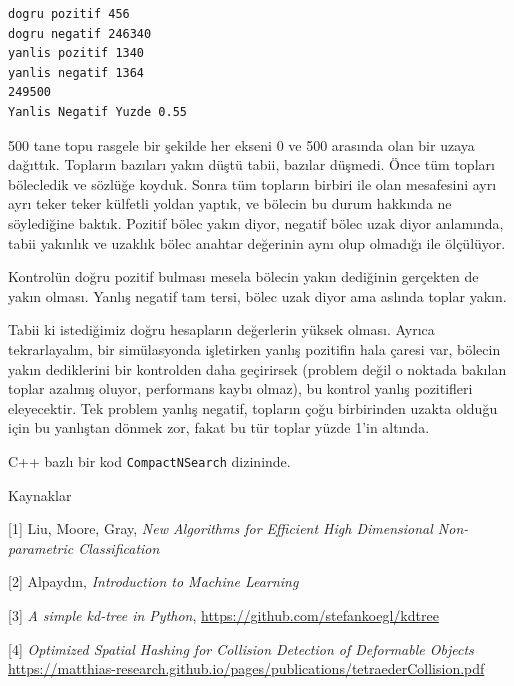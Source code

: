 \documentclass[12pt,fleqn]{article}\usepackage{../../common}
\begin{document}
\begin{verbatim}
dogru pozitif 456
dogru negatif 246340
yanlis pozitif 1340
yanlis negatif 1364
249500
Yanlis Negatif Yuzde 0.55
\end{verbatim}

500 tane topu rasgele bir şekilde her ekseni 0 ve 500 arasında olan bir uzaya
dağıttık. Topların bazıları yakın düştü tabii, bazılar düşmedi. Önce tüm topları
bölecledik ve sözlüğe koyduk. Sonra tüm topların birbiri ile olan mesafesini
ayrı ayrı teker teker külfetli yoldan yaptık, ve bölecin bu durum hakkında ne
söylediğine baktık. Pozitif bölec yakın diyor, negatif bölec uzak diyor
anlamında, tabii yakınlık ve uzaklık bölec anahtar değerinin aynı olup olmadığı
ile ölçülüyor.

Kontrolün doğru pozitif bulması mesela bölecin yakın dediğinin gerçekten de
yakın olması. Yanlış negatif tam tersi, bölec uzak diyor ama aslında toplar
yakın.

Tabii ki istediğimiz doğru hesapların değerlerin yüksek olması. Ayrıca
tekrarlayalım, bir simülasyonda işletirken yanlış pozitifin hala çaresi var,
bölecin yakın dediklerini bir kontrolden daha geçirirsek (problem değil o
noktada bakılan toplar azalmış oluyor, performans kaybı olmaz), bu kontrol
yanlış pozitifleri eleyecektir. Tek problem yanlış negatif, topların çoğu
birbirinden uzakta olduğu için bu yanlıştan dönmek zor, fakat bu tür toplar
yüzde 1'in altında.

C++ bazlı bir kod \verb!CompactNSearch! dizininde. 

Kaynaklar

[1] Liu, Moore, Gray, {\em New Algorithms for Efficient High Dimensional
  Non-parametric Classification}

[2] Alpaydın, {\em Introduction to Machine Learning}

[3] {\em A simple kd-tree in Python}, \url{https://github.com/stefankoegl/kdtree}

[4] {\em Optimized Spatial Hashing for Collision Detection of Deformable Objects}
    \url{https://matthias-research.github.io/pages/publications/tetraederCollision.pdf}
\end{document}
